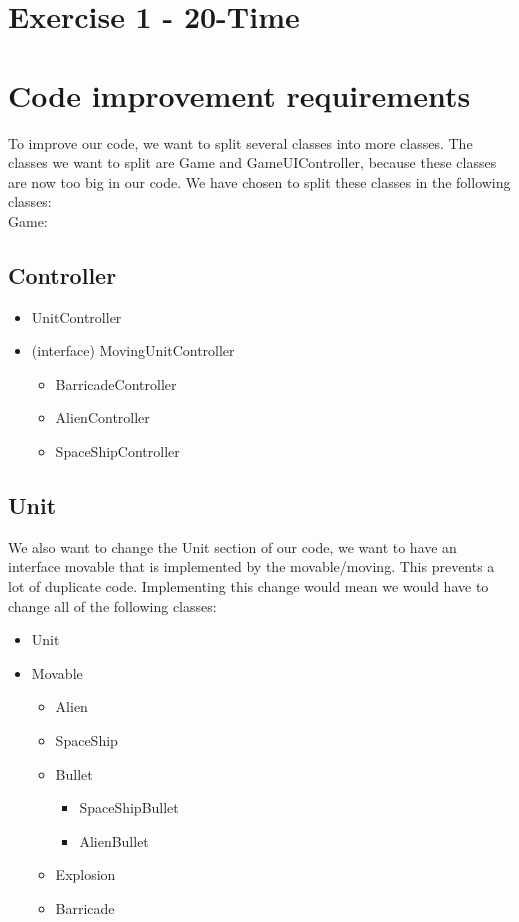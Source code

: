 \section*{Exercise 1 - 20-Time}
\section*{Code improvement requirements}
To improve our code, we want to split several classes into more classes. The classes we want to split are Game and GameUIController, because these classes are now too big in our code. We have chosen to split these classes in the following classes:\\
Game:\newline
\subsection*{Controller}
\begin{itemize}
	\item UnitController
	\item (interface) MovingUnitController
	\begin{itemize}
	\item BarricadeController	
	\item AlienController
	\item SpaceShipController
	\end{itemize}
\end{itemize}
\subsection*{Unit}
We also want to change the Unit section of our code, we want to have an interface movable that is implemented by the movable/moving. This prevents a lot of duplicate code. Implementing this change would mean we would have to change all of the following classes:
	\begin{itemize}
	\item Unit
	\item Movable
		\begin{itemize}
		\item Alien
		\item SpaceShip
		\item Bullet
		\begin{itemize}
			\item SpaceShipBullet
			\item AlienBullet
		\end{itemize}
		\item Explosion
		\item Barricade
	\end{itemize}
\end{itemize}
